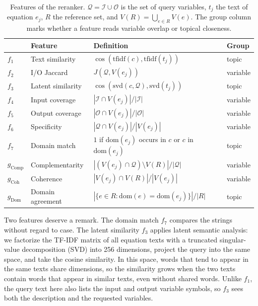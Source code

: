 \begin{table}[H]
\centering
\caption{Features of the reranker. $\mathcal{Q} = \mathcal{I} \cup \mathcal{O}$ is the set of query
variables, $t_j$ the text of equation $e_j$, $R$ the reference set, and $V(R) = \bigcup_{e \in R}
V(e)$. The group column marks whether a feature reads variable overlap or topical closeness.}
\label{tab:features}
\small
\begin{tabular}{llll}
\toprule
 & Feature & Definition & Group \\
\midrule
$f_1$ & Text similarity     & $\cos(\mathrm{tfidf}(c), \mathrm{tfidf}(t_j))$ & topic \\
$f_2$ & I/O Jaccard         & $J(\mathcal{Q}, V(e_j))$ & variable \\
$f_3$ & Latent similarity   & $\cos(\mathrm{svd}(c, \mathcal{Q}), \mathrm{svd}(t_j))$ & topic \\
$f_4$ & Input coverage      & $|\mathcal{I} \cap V(e_j)| / |\mathcal{I}|$ & variable \\
$f_5$ & Output coverage     & $|\mathcal{O} \cap V(e_j)| / |\mathcal{O}|$ & variable \\
$f_6$ & Specificity         & $|\mathcal{Q} \cap V(e_j)| / |V(e_j)|$ & variable \\
$f_7$ & Domain match        & $1$ if $\mathrm{dom}(e_j)$ occurs in $c$ or $c$ in $\mathrm{dom}(e_j)$ & topic \\
\midrule
$g_{\mathrm{Comp}}$ & Complementarity  & $|(V(e_j) \cap \mathcal{Q}) \setminus V(R)| / |\mathcal{Q}|$ & variable \\
$g_{\mathrm{Coh}}$  & Coherence        & $|V(e_j) \cap V(R)| / |V(e_j)|$ & variable \\
$g_{\mathrm{Dom}}$  & Domain agreement & $|\{e \in R : \mathrm{dom}(e) = \mathrm{dom}(e_j)\}| / |R|$ & topic \\
\bottomrule
\end{tabular}
\end{table}

Two features deserve a remark. The domain match $f_7$ compares the strings without regard to case.
The latent similarity $f_3$ applies latent semantic analysis\cite{LSA}: we factorize the TF-IDF
matrix of all equation texts with a truncated singular-value decomposition (SVD) into 256
dimensions, project the query into the same space, and take the cosine similarity. In this space,
words that tend to appear in the same texts share dimensions, so the similarity grows when the two
texts contain words that appear in similar texts, even without shared words. Unlike $f_1$, the
query text here also lists the input and output variable symbols, so $f_3$ sees both the
description and the requested variables.

